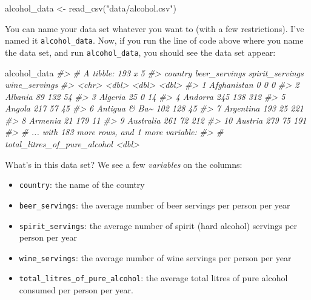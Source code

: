 \documentclass[
]{book}
\newenvironment{Shaded}{\begin{snugshade}}{\end{snugshade}}
\newcommand{\CommentTok}[1]{\textcolor[rgb]{0.56,0.35,0.01}{\textit{#1}}}
\newcommand{\FunctionTok}[1]{\textcolor[rgb]{0.00,0.00,0.00}{#1}}
\newcommand{\NormalTok}[1]{#1}
\newcommand{\OtherTok}[1]{\textcolor[rgb]{0.56,0.35,0.01}{#1}}
\newcommand{\StringTok}[1]{\textcolor[rgb]{0.31,0.60,0.02}{#1}}
\providecommand{\tightlist}{%
  \setlength{\itemsep}{0pt}\setlength{\parskip}{0pt}}
\begin{document}
\begin{Shaded}
\begin{Highlighting}[]
\NormalTok{alcohol\_data }\OtherTok{\textless{}{-}} \FunctionTok{read\_csv}\NormalTok{(}\StringTok{"data/alcohol.csv"}\NormalTok{)}
\end{Highlighting}
\end{Shaded}

You can name your data set whatever you want to (with a few restrictions). I've named it \texttt{alcohol\_data}. Now, if you run the line of code above where you name the data set, and run \texttt{alcohol\_data}, you should see the data set appear:

\begin{Shaded}
\begin{Highlighting}[]
\NormalTok{alcohol\_data}
\CommentTok{\#\textgreater{} \# A tibble: 193 x 5}
\CommentTok{\#\textgreater{}    country       beer\_servings spirit\_servings wine\_servings}
\CommentTok{\#\textgreater{}    \textless{}chr\textgreater{}                 \textless{}dbl\textgreater{}           \textless{}dbl\textgreater{}         \textless{}dbl\textgreater{}}
\CommentTok{\#\textgreater{}  1 Afghanistan               0               0             0}
\CommentTok{\#\textgreater{}  2 Albania                  89             132            54}
\CommentTok{\#\textgreater{}  3 Algeria                  25               0            14}
\CommentTok{\#\textgreater{}  4 Andorra                 245             138           312}
\CommentTok{\#\textgreater{}  5 Angola                  217              57            45}
\CommentTok{\#\textgreater{}  6 Antigua \& Ba\textasciitilde{}           102             128            45}
\CommentTok{\#\textgreater{}  7 Argentina               193              25           221}
\CommentTok{\#\textgreater{}  8 Armenia                  21             179            11}
\CommentTok{\#\textgreater{}  9 Australia               261              72           212}
\CommentTok{\#\textgreater{} 10 Austria                 279              75           191}
\CommentTok{\#\textgreater{} \# ... with 183 more rows, and 1 more variable:}
\CommentTok{\#\textgreater{} \#   total\_litres\_of\_pure\_alcohol \textless{}dbl\textgreater{}}
\end{Highlighting}
\end{Shaded}

What's in this data set? We see a few \emph{variables} on the columns:

\begin{itemize}
\tightlist
\item
  \texttt{country}: the name of the country
\item
  \texttt{beer\_servings}: the average number of beer servings per person per year
\item
  \texttt{spirit\_servings}: the average number of spirit (hard alcohol) servings per person per year
\item
  \texttt{wine\_servings}: the average number of wine servings per person per year
\item
  \texttt{total\_litres\_of\_pure\_alcohol}: the average total litres of pure alcohol consumed per person per year.
\end{itemize}
\end{document}

